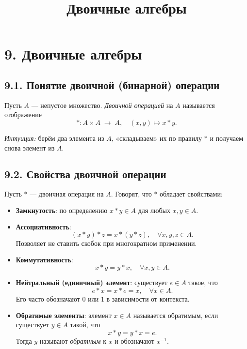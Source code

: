 \documentclass{article}
\begin{document}
\title{Двоичные алгебры}
\author{}
\date{}
\makeatletter
\renewcommand{\maketitle}{
  \begin{center}
    {\Large\mdseries\@title\par}
    \vspace{0.5em}
  \end{center}
}
\makeatother
\maketitle

\section*{9. Двоичные алгебры}

\subsection*{9.1. Понятие двоичной (бинарной) операции}

\begin{definition}
Пусть $A$ — непустое множество. \emph{Двоичной операцией} на $A$ называется отображение
\[
  * : A \times A \;\longrightarrow\; A,
  \quad (x,y)\mapsto x*y.
\]
\end{definition}

\emph{Интуиция:} берём два элемента из $A$, «складываем» их по правилу $*$ и получаем снова элемент из $A$.

\subsection*{9.2. Свойства двоичной операции}

Пусть $*$ — двоичная операция на $A$. Говорят, что $*$ обладает свойствами:

\begin{itemize}[leftmargin=*]
  \item \textbf{Замкнутость}: по определению $x*y\in A$ для любых $x,y\in A$.
  \item \textbf{Ассоциативность}:
    \[
      (x*y)*z = x*(y*z),\quad \forall x,y,z\in A.
    \]
    Позволяет не ставить скобок при многократном применении.
  \item \textbf{Коммутативность}:
    \[
      x*y = y*x,\quad \forall x,y\in A.
    \]
  \item \textbf{Нейтральный (единичный) элемент}: существует $e\in A$ такое, что
    \[
      e*x = x*e = x,\quad \forall x\in A.
    \]
    Его часто обозначают $0$ или $1$ в зависимости от контекста.
  \item \textbf{Обратимые элементы}: элемент $x\in A$ называется обратимым, если существует $y\in A$ такой, что
    \[
      x*y = y*x = e.
    \]
    Тогда $y$ называют \emph{обратным} к $x$ и обозначают $x^{-1}$.
\end{itemize}
\end{document}
